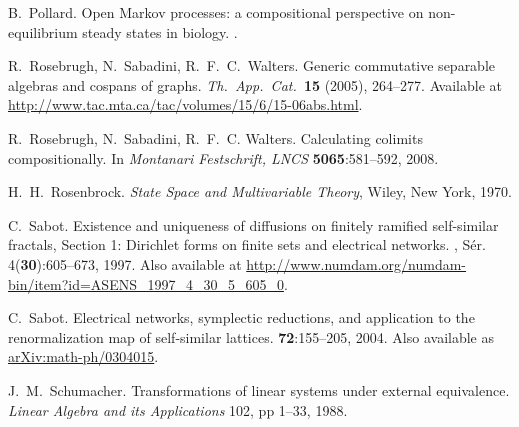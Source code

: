 \begin{thebibliography}{RSW00}
    B.\ Pollard.
    \newblock Open Markov processes: a compositional
    perspective on non-equilibrium steady states in biology.
    .

    R.\ Rosebrugh, N.\ Sabadini, R.\ F.\ C.\ Walters.
    \newblock Generic
    commutative separable algebras and cospans of graphs.
    \newblock \textsl{Th.\ App.\
    Cat.\ }\textbf{15} (2005), 264--277.
    \newblock Available at
    \href{http://www.tac.mta.ca/tac/volumes/15/6/15-06abs.html}{http://www.tac.mta.ca/tac/volumes/15/6/15-06abs.html}.

    R.\ Rosebrugh, N.\ Sabadini, R.\ F.\ C. Walters.
    \newblock Calculating
    colimits compositionally.
    \newblock In \emph{Montanari Festschrift, LNCS} {\bf 5065}:581--592, 2008.

    H.\ H.\ Rosenbrock.
    \newblock \emph{State Space and Multivariable Theory},
    Wiley, New York, 1970. 


    C.\ Sabot.
    \newblock Existence and uniqueness of diffusions on
    finitely ramified self-similar fractals, Section 1: Dirichlet forms on
    finite sets and electrical networks.
    , S\'er. 4({\bf 30}):605--673, 1997.
    \newblock Also available at
    \href{http://www.numdam.org/numdam-bin/item?id=ASENS_1997_4_30_5_605_0}{http://www.numdam.org/numdam-bin/item?id=ASENS\_1997\_4\_30\_5\_605\_0}.

    C.\ Sabot.
    \newblock Electrical networks, symplectic reductions, and
    application to the renormalization map of self-similar lattices.
     {\bf 72}:155--205, 2004.
    \newblock Also available as
    \href{http://arxiv.org/abs/math-ph/0304015}{arXiv:math-ph/0304015}.

    J.\ M.\ Schumacher.
    \newblock Transformations of linear systems under
    external equivalence.
    \newblock \emph{Linear Algebra and its Applications} 102,
    pp 1--33, 1988.



\end{thebibliography}
